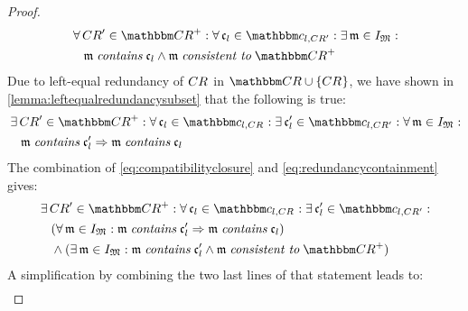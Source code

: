 \begin{proof}
\begin{align}
        & \nonumber
        \forall \consistencyrelation{CR}{}' \in \transitiveclosure{\consistencyrelationset{CR}} : \forall \conditionelement{c}{l} \in \condition{c}{l, \consistencyrelation{CR}{}'} : \exists \modeltuple{m} \in \metamodeltupleinstanceset{M} : \\
        & \formulaskip
        \modeltuple{m} \containsmath \conditionelement{c}{l} \land \modeltuple{m} \consistenttomath \transitiveclosure{\consistencyrelationset{CR}}
    \end{align}
    Due to left-equal redundancy of $\consistencyrelation{CR}{}$ in $\consistencyrelationset{CR} \cup \setted{\consistencyrelation{CR}{}}$, we have shown in \autoref{lemma:leftequalredundancysubset} that the following is true:
    \begin{align} \label{eq:redundancycontainment}
        & \nonumber 
        \exists \consistencyrelation{CR}{}' \in \transitiveclosure{\consistencyrelationset{CR}} : \forall \conditionelement{c}{l} \in \condition{c}{l, \consistencyrelation{CR}{}} : \exists \conditionelement{c}{l}' \in \condition{c}{l,\consistencyrelation{CR}{}'} : \forall \modeltuple{m} \in \metamodeltupleinstanceset{M} : \\
        & \formulaskip
        \modeltuple{m} \containsmath \conditionelement{c}{l}' \Rightarrow \modeltuple{m} \containsmath \conditionelement{c}{l}
    \end{align}
    The combination of \autoref{eq:compatibilityclosure} and \autoref{eq:redundancycontainment} gives:
    \begin{align*}
        & \nonumber 
        \exists \consistencyrelation{CR}{}' \in \transitiveclosure{\consistencyrelationset{CR}} : \forall \conditionelement{c}{l} \in \condition{c}{l, \consistencyrelation{CR}{}} : \exists \conditionelement{c}{l}' \in \condition{c}{l,\consistencyrelation{CR}{}'} : \\
        & \formulaskip
        (\forall \modeltuple{m} \in \metamodeltupleinstanceset{M} : \modeltuple{m} \containsmath \conditionelement{c}{l}' \Rightarrow \modeltuple{m} \containsmath \conditionelement{c}{l}) \\
        & \formulaskip
        \land (\exists \modeltuple{m} \in \metamodeltupleinstanceset{M} :
        \modeltuple{m} \containsmath \conditionelement{c}{l}' \land \modeltuple{m} \consistenttomath \transitiveclosure{\consistencyrelationset{CR}})
    \end{align*}
    A simplification by combining the two last lines of that statement leads to:
    \begin{align*}

\end{align*}
\end{proof}
